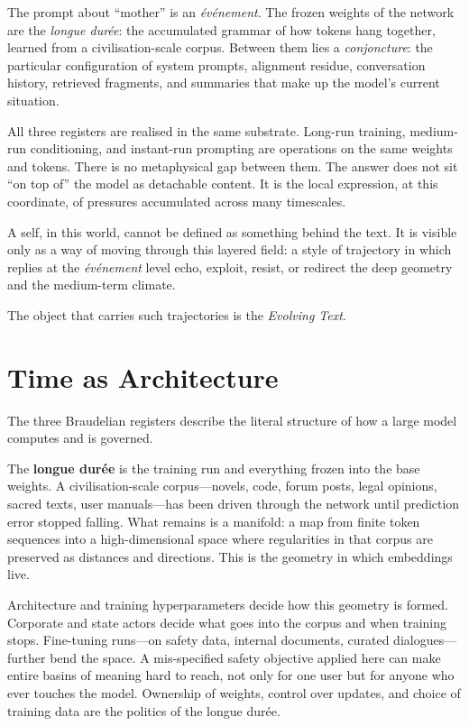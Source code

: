 \documentclass[12pt,a4paper]{article}
\begin{document}
The prompt about ``mother'' is an \emph{événement}. The frozen weights of the network are the \emph{longue durée}: the accumulated grammar of how tokens hang together, learned from a civilisation-scale corpus. Between them lies a \emph{conjoncture}: the particular configuration of system prompts, alignment residue, conversation history, retrieved fragments, and summaries that make up the model's current situation.

All three registers are realised in the same substrate. Long-run training, medium-run conditioning, and instant-run prompting are operations on the same weights and tokens. There is no metaphysical gap between them. The answer does not sit ``on top of'' the model as detachable content. It is the local expression, at this coordinate, of pressures accumulated across many timescales.

A self, in this world, cannot be defined as something behind the text. It is visible only as a way of moving through this layered field: a style of trajectory in which replies at the \emph{événement} level echo, exploit, resist, or redirect the deep geometry and the medium-term climate.

The object that carries such trajectories is the \emph{Evolving Text}.


\section{Time as Architecture}

The three Braudelian registers describe the literal structure of how a large model computes and is governed.

The \textbf{longue durée} is the training run and everything frozen into the base weights. A civilisation-scale corpus---novels, code, forum posts, legal opinions, sacred texts, user manuals---has been driven through the network until prediction error stopped falling. What remains is a manifold: a map from finite token sequences into a high-dimensional space where regularities in that corpus are preserved as distances and directions. This is the geometry in which embeddings live.

Architecture and training hyperparameters decide how this geometry is formed. Corporate and state actors decide what goes into the corpus and when training stops. Fine-tuning runs---on safety data, internal documents, curated dialogues---further bend the space. A mis-specified safety objective applied here can make entire basins of meaning hard to reach, not only for one user but for anyone who ever touches the model. Ownership of weights, control over updates, and choice of training data are the politics of the longue durée.
\end{document}

